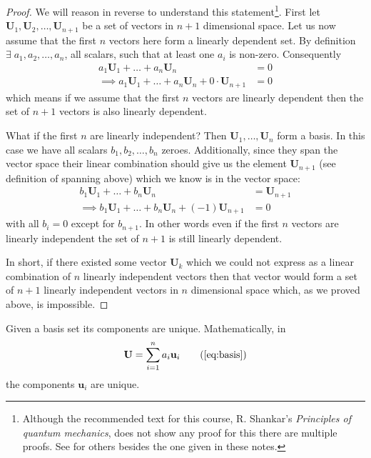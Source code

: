 \documentclass[english,seminar,headertitle]{lecture}
\begin{document}
\begin{proof}
	We will reason in reverse to understand this statement\footnote{Although the recommended text for this course, R. Shankar’s \textit{Principles of quantum mechanics}, does not show any proof for this there are multiple proofs. See \cite{theorem1} for others besides the one given in these notes.}. First let $\mathbf{U}_1, \mathbf{U}_2,\ldots,\mathbf{U}_{n+1}$ be a set of vectors in $n+1$ dimensional space. Let us now assume that the first $n$ vectors here form a linearly dependent set. By definition $\exists \; a_1, a_2, \ldots, a_n$, all scalars, such that at least one $a_i$ is non-zero. Consequently
	\begin{align*}
		a_1\mathbf{U}_1 + \ldots + a_n\mathbf{U}_n &= 0 \\
		\implies a_1\mathbf{U}_1 + \ldots + a_n \mathbf{U}_n + 0 \cdot \mathbf{U}_{n+1} &= 0
	\end{align*}
		which means if we assume that the first $n$ vectors are linearly dependent then the set of $n+1$ vectors is also linearly dependent.
		
		What if the first $n$ are linearly independent? Then $\mathbf{U}_1, \ldots, \mathbf{U}_n$ form a basis. In this case we have all scalars $b_1, b_2, \ldots, b_n$ zeroes. Additionally, since they span the vector space their linear combination should give us the element $\mathbf{U}_{n+1}$ (see definition of spanning above) which we know is in the vector space:
		\begin{align*}
			b_1\mathbf{U}_1 + \ldots + b_n\mathbf{U}_n &= \mathbf{U}_{n+1} \\
			\implies b_1\mathbf{U}_1 + \ldots + b_n\mathbf{U}_n + (-1) \mathbf{U}_{n+1} &= 0
		\end{align*}
		with all $b_i = 0$ except for $b_{n+1}$. In other words even if the first $n$ vectors are linearly independent the set of $n+1$ is still linearly dependent.
		
		In short, if there existed some vector $\mathbf{U}_k$ which we could not express as a linear combination of $n$ linearly independent vectors then that vector would form a set of $n+1$ linearly independent vectors in $n$ dimensional space which, as we proved above, is impossible.
\end{proof}

\begin{theorem}
	Given a basis set its components are unique. Mathematically, in
	\[
		\mathbf{U} = \sum_{i=1}^n a_i \mathbf{u}_i \tag{\ref{eq:basis}}
	\]
	the components $\mathbf{u}_i$ are unique.
\end{theorem}
\end{document}
